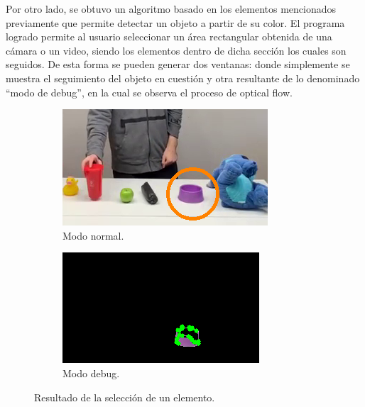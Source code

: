 Por otro lado, se obtuvo un algoritmo basado en los elementos mencionados previamente que permite detectar un objeto a partir de su color. El programa logrado permite al usuario seleccionar un área rectangular obtenida de una cámara o un video, siendo los elementos dentro de dicha sección los cuales son seguidos. De esta forma se pueden generar dos ventanas: donde simplemente se muestra el seguimiento del objeto en cuestión y otra resultante de lo denominado ``modo de debug'', en la cual se observa el proceso de optical flow.
\begin{figure}[H]
\centering
	\begin{subfigure}{.4\textwidth}
		\centering
		\includegraphics[width=\textwidth]{Imagenes/Optical1.png}
		\caption{Modo normal.}
		\label{fig:optical1}
	\end{subfigure}
	\begin{subfigure}{.4\textwidth}
		\centering
		\includegraphics[width=\textwidth]{Imagenes/Optical2.png}
		\caption{Modo debug.}
		\label{fig:optical2}
	\end{subfigure}
	\caption{Resultado de la selección de un elemento.}
	\label{fig:optical12}
\end{figure}

